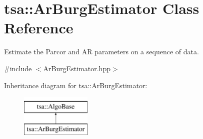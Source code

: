 \hypertarget{classtsa_1_1_ar_burg_estimator}{}\section{tsa\+:\+:Ar\+Burg\+Estimator Class Reference}
\label{classtsa_1_1_ar_burg_estimator}


Estimate the Parcor and AR parameters on a sequence of data.  




{\ttfamily \#include $<$Ar\+Burg\+Estimator.\+hpp$>$}

Inheritance diagram for tsa\+:\+:Ar\+Burg\+Estimator\+:\begin{figure}[H]
\begin{center}
\leavevmode
\includegraphics[height=2.000000cm]{classtsa_1_1_ar_burg_estimator}
\end{center}
\end{figure}
